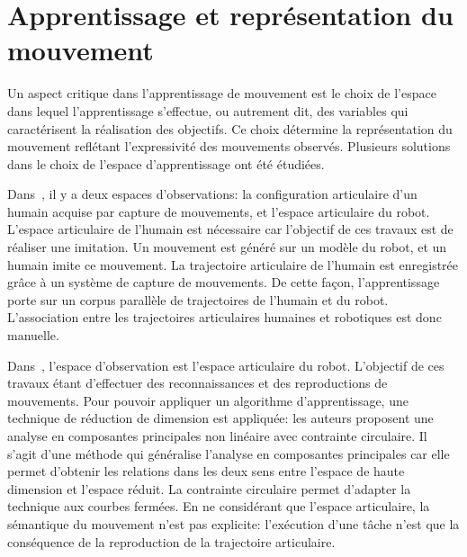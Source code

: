 \section{Apprentissage et représentation du mouvement}
Un aspect critique dans l'apprentissage de mouvement est le
choix de l'espace dans lequel l'apprentissage s'effectue, ou
autrement dit, des variables qui caractérisent la réalisation
des objectifs.
Ce choix détermine la représentation du mouvement reflétant l'expressivité des 
mouvements observés.
Plusieurs solutions dans le choix de l'espace d'apprentissage ont été étudiées.

Dans~\cite{shon05}, il y a deux espaces d'observations: la configuration articulaire d'un humain
acquise par capture de mouvements, et l'espace articulaire du robot.
L'espace articulaire de l'humain est nécessaire car l'objectif
de ces travaux est de réaliser une imitation.
Un mouvement est généré sur un modèle du robot, et un humain imite ce mouvement.
La trajectoire articulaire de l'humain est enregistrée gr\^ace à un système de capture
de mouvements. De cette façon, l'apprentissage porte sur un corpus parallèle
de trajectoires de l'humain et du robot. L'association entre les trajectoires articulaires
humaines et robotiques est donc manuelle. 

Dans~\cite{chalodhorn09}, l'espace d'observation est l'espace articulaire du robot.
L'objectif de ces travaux étant d'effectuer des reconnaissances et des reproductions 
de mouvements. Pour pouvoir appliquer un algorithme d'apprentissage, 
une technique de réduction de dimension est appliquée:
les auteurs proposent une analyse en composantes principales
non linéaire avec contrainte circulaire. Il s'agit d'une méthode qui généralise
l'analyse en composantes principales car elle permet d'obtenir les relations dans les deux
sens entre l'espace de haute dimension et l'espace réduit. La contrainte circulaire permet
d'adapter la technique aux courbes fermées.
En ne considérant que l'espace articulaire,
la sémantique du mouvement n'est pas explicite: l'exécution d'une t\^ache
n'est que la conséquence de la reproduction de la trajectoire articulaire. 

